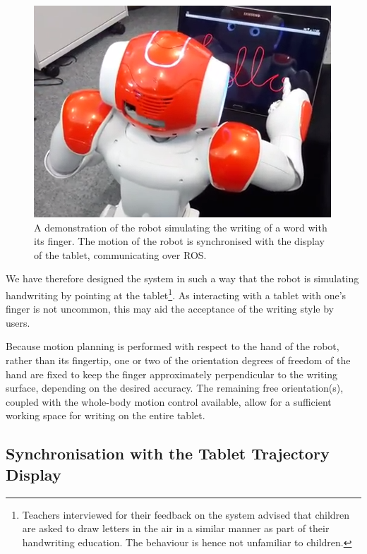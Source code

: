 \documentclass{sig-alternate}
\begin{document}
\begin{figure}[thpb]
     \begin{center}
            \includegraphics[width=0.7\linewidth]{figures/naoWriting2.png}
    \end{center}
    \caption{A demonstration of the robot simulating the writing of a word with
    its finger. The motion of the robot is synchronised with the display of the
    tablet, communicating over ROS.\protect\footnotemark}%

   \label{fig:naoWriting}
\end{figure}

We have therefore designed the system in such a way that the robot is simulating
handwriting by pointing at the tablet\footnote{Teachers interviewed for their
feedback on the system advised that children are asked to draw letters in
the air in a similar manner as part of their handwriting education. The
behaviour is hence not unfamiliar to children.}. As interacting with a
tablet with one's finger is not uncommon, this may aid the acceptance of the
writing style by users. 

Because motion planning is performed with respect to the hand of the robot,
rather than its fingertip, one or two of the orientation degrees of freedom of
the hand are fixed to keep the finger approximately perpendicular to the writing
surface, depending on the desired accuracy. The remaining free orientation(s),
coupled with the whole-body motion control available, allow for a sufficient
working space for writing on the entire tablet.

\subsection{Synchronisation with the Tablet Trajectory Display}\label{sec:tabletSynch}
\end{document}
